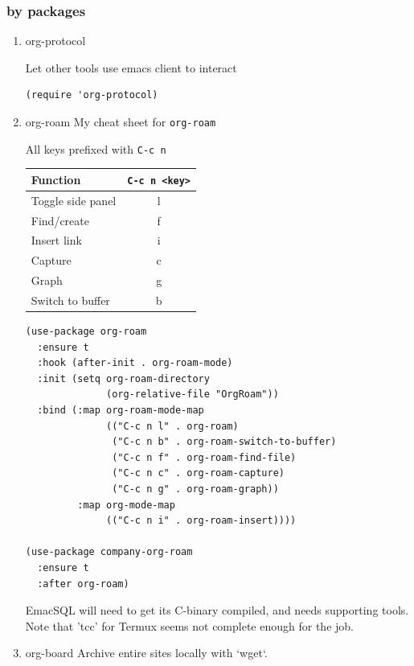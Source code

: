 \documentclass[11pt]{article}
\begin{document}
\subsubsection{by packages}
\label{sec:org3a049c8}
\begin{enumerate}
\item org-protocol
\label{sec:org60621f7}

Let other tools use emacs client to interact

\begin{verbatim}
(require 'org-protocol)
\end{verbatim}

\item org-roam
\label{sec:org89906ea}
My cheat sheet for \texttt{org-roam}

All keys prefixed with \texttt{C-c n}

\begin{center}
\begin{tabular}{lc}
\hline
Function & \texttt{C-c n <key>}\\
\hline
Toggle side panel & l\\
\hline
Find/create & f\\
Insert link & i\\
Capture & c\\
\hline
Graph & g\\
Switch to buffer & b\\
\hline
\end{tabular}
\end{center}


\begin{verbatim}
(use-package org-roam
  :ensure t
  :hook (after-init . org-roam-mode)
  :init (setq org-roam-directory
              (org-relative-file "OrgRoam"))
  :bind (:map org-roam-mode-map
              (("C-c n l" . org-roam)
               ("C-c n b" . org-roam-switch-to-buffer)
               ("C-c n f" . org-roam-find-file)
               ("C-c n c" . org-roam-capture)
               ("C-c n g" . org-roam-graph))
         :map org-mode-map
              (("C-c n i" . org-roam-insert))))

(use-package company-org-roam
  :ensure t
  :after org-roam)
\end{verbatim}

EmacSQL will need to get its C-binary compiled, and needs supporting
tools. Note that 'tcc' for Termux seems not complete enough for the
job.

\item org-board
\label{sec:org540eae2}
Archive entire sites locally with `wget`.


\end{enumerate}
\end{document}
